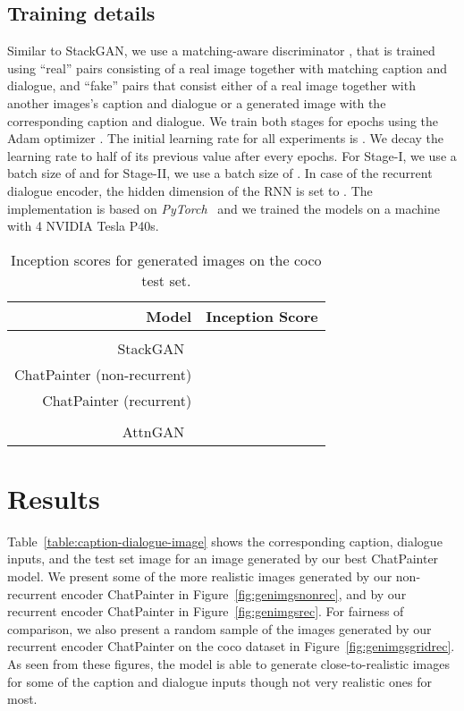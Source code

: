 \documentclass{article}
\begin{document}
\subsection{Training details}
Similar to StackGAN, we use a matching-aware discriminator \cite{ICML2016_reed}, that is trained using ``real'' pairs consisting of a real image together with matching caption and dialogue, and ``fake'' pairs that consist either of a real image together with another images's caption and dialogue or a generated image with the corresponding caption and dialogue. We train both stages for  epochs using the Adam optimizer \cite{kingma2014adam}. The initial learning rate for all experiments is . We decay the learning rate to half of its previous value after every  epochs. For Stage-I, we use a batch size of  and for Stage-II, we use a batch size of . In case of the recurrent dialogue encoder, the hidden dimension of the RNN is set to . The implementation is based on \textit{PyTorch}~\cite{paszke2017automatic} and we trained the models on a machine with 4 NVIDIA Tesla P40s.

\setcounter{footnote}{1}
\begin{table}[t]
	\caption{Inception scores for generated images on the \gls{coco} test set\footnotemark.}
	\label{table:inception-score}
	\begin{center}
		\begin{tabular}{|r|r|}\hline
			\multicolumn{1}{|r|}{\bf Model}  &\multicolumn{1}{r|}{\bf Inception Score}
			\\ \hline
			\citet{ICML2016_reed}            &  \\ \hline
			StackGAN~\cite{Zhang_2017_ICCV}  &  \\
			ChatPainter (non-recurrent)      &  \\
			ChatPainter (recurrent)          &  \\ \hline
			\citet{honglak2018}              &  \\
			AttnGAN~\cite{attngan}           &  \\ \hline
		\end{tabular}
	\end{center}
\end{table}


\section{Results}
Table~\ref{table:caption-dialogue-image} shows the corresponding caption, dialogue inputs, and the test set image for an image generated by our best ChatPainter model. We present some of the more realistic images generated by our non-recurrent encoder ChatPainter in Figure~\ref{fig:genimgsnonrec}, and by our recurrent encoder ChatPainter in Figure~\ref{fig:genimgsrec}. For fairness of comparison, we also present a random sample of the images generated by our recurrent encoder ChatPainter on the \gls{coco} dataset in Figure~\ref{fig:genimgsgridrec}. As seen from these figures, the model is able to generate close-to-realistic images for some of the caption and dialogue inputs though not very realistic ones for most.
\end{document}
